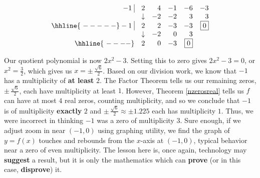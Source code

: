 \begin{ex}
\begin{enumerate}
\[\begin{array}{rrrrrr}
 -1 \, \, \vline& 2 & 4 & -1  & -6 & -3 \\

  & \downarrow     &  -2  &  -2  & 3 & 3\\ \hhline{~-----} 
  
  -1 \, \, \vline&  2 &   2  & -3 & -3 &  \fbox{$0$}  \\
    
               & \downarrow &  -2  &  0  & 3 &\\ \hhline{~----} 
 
   & 2  &   0  & -3& \fbox{0} &   \\
  
        

\end{array}\]

 Our quotient polynomial is now $2x^2 - 3$.  Setting this to zero gives $2x^2 - 3 = 0$, or $x^2 = \frac{3}{2}$, which gives us $x = \pm \, \frac{\sqrt{6}}{2}$.  Based on our division work, we know that $-1$ has a multiplicity of \textbf{at least} $2$. The Factor Theorem tells us our remaining zeros, $\pm \, \frac{\sqrt{6}}{2}$, each have multiplicity at least $1$.  However, Theorem \ref{nzerosreal} tells us $f$ can have at most $4$ real zeros, counting multiplicity, and so we conclude that $-1$ is of multiplicity \textbf{exactly} $2$ and $\pm \, \frac{\sqrt{6}}{2} \approx \pm 1.225$ each has multiplicity $1$. Thus, we were incorrect in thinking  $-1$ was a zero of multiplicity $3$.  Sure enough, if we adjust zoom in near $(-1,0)$ using graphing utility, we find the graph of $y = f(x)$ touches and rebounds from the $x$-axis at $(-1,0)$, typical behavior near a zero of even multiplicity. The lesson here is, once again, technology may \textbf{suggest} a result, but it is only the mathematics which can \textbf{prove} (or in this case, \textbf{disprove}) it.  

\end{enumerate}

\begin{center}

\begin{tabular}{cc}


\end{tabular}
\end{center}
\end{ex}
